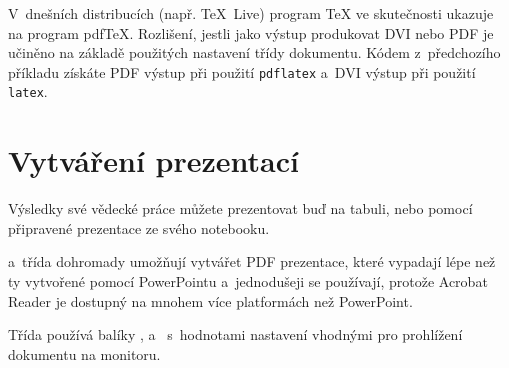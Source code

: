 V~dnešních distribucích (např. \TeX~Live) program \TeX{} ve skutečnosti
ukazuje na program pdf\TeX. Rozlišení, jestli jako výstup produkovat 
DVI nebo PDF je učiněno na základě použitých nastavení třídy dokumentu.
Kódem z~předchozího příkladu získáte PDF výstup při použití
\verb|pdflatex| a~DVI výstup při použití \verb|latex|.

\section{Vytváření prezentací}
\label{sec:beamer}
Výsledky své vědecké práce můžete prezentovat buď na tabuli, nebo
pomocí připravené prezentace ze svého notebooku.

\wi{\pdfLaTeX} a~třída  dohromady umožňují vytvářet
PDF prezentace, které vypadají lépe než ty vytvořené pomocí
PowerPointu a~jednodušeji se používají, protože Acrobat Reader
je dostupný na mnohem více platformách než PowerPoint.

Třída  používá balíky , 
a~ s~hodnotami nastavení vhodnými pro prohlížení
dokumentu na monitoru.



